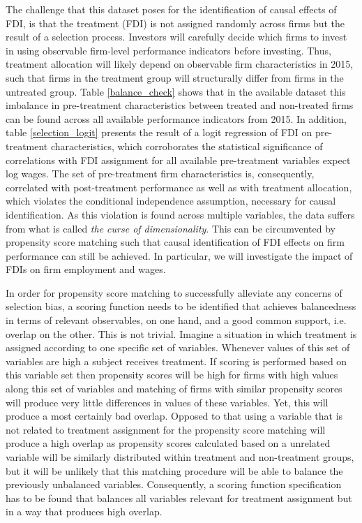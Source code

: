 \documentclass[11pt,a4paper,leqno]{article}
\begin{document}
The challenge that this dataset poses for the identification of causal effects of FDI, is that the treatment (FDI) is not assigned randomly across firms but the result of a selection process. Investors will carefully decide which firms to invest in using observable firm-level performance indicators before investing. Thus, treatment allocation will likely depend on observable firm characteristics in 2015, such that firms in the treatment group will structurally differ from firms in the untreated group. Table \ref{balance_check} shows that in the available dataset this imbalance in pre-treatment characteristics between treated and non-treated firms can be found across all available performance indicators from 2015. In addition, table \ref{selection_logit} presents the result of a logit regression of FDI on pre-treatment characteristics, which corroborates the statistical significance of correlations with FDI assignment for all available pre-treatment variables expect log wages. The set of pre-treatment firm characteristics is, consequently, correlated with post-treatment performance as well as with treatment allocation, which violates the conditional independence assumption, necessary for causal identification. As this violation is found across multiple variables, the data suffers from what is called \textit{the curse of dimensionality}. This can be circumvented by propensity score matching such that causal identification of FDI effects on firm performance can still be achieved. In particular, we will investigate the impact of FDIs on firm employment and wages.\\ \par 

 


 
 In order for propensity score matching to successfully alleviate any concerns of selection bias, a scoring function needs to be identified that achieves balancedness in terms of relevant observables, on one hand, and a good common support, i.e. overlap on the other. This is not trivial. Imagine a situation in which treatment is assigned according to one specific set of variables. Whenever values of this set of variables are high a subject receives treatment. If scoring is performed based on this variable set then propensity scores will be high for firms with high values along this set of variables and matching of firms with similar propensity scores will produce very little differences in values of these variables. Yet, this will produce a most certainly bad overlap. Opposed to that using a variable that is not related to treatment assignment for the propensity score matching will produce a high overlap as propensity scores calculated based on a unrelated variable will be similarly distributed within treatment and non-treatment groups, but it will be unlikely that this matching procedure will be able to balance the previously unbalanced variables. Consequently, a scoring function specification has to be found that balances all variables relevant for treatment assignment but in a way that produces high overlap. \\ \par 
 
\end{document}
